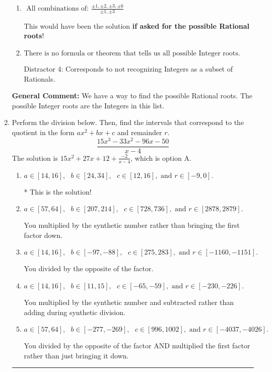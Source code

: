 \documentclass{extbook}[14pt]
\newcommand{\litem}[1]{\item #1

\rule{\textwidth}{0.4pt}}
\begin{document}
\begin{enumerate}
{\begin{enumerate}[label=\Alph*.]
 Distractor 3: Corresponds to the plus or minus of the inverse quotient (an/a0) of the factors. 
\item \( \text{ All combinations of: }\frac{\pm 1,\pm 2,\pm 3,\pm 6}{\pm 1,\pm 3} \)

This would have been the solution \textbf{if asked for the possible Rational roots}!
\item \( \text{There is no formula or theorem that tells us all possible Integer roots.} \)

 Distractor 4: Corresponds to not recognizing Integers as a subset of Rationals.
\end{enumerate}

\textbf{General Comment:} We have a way to find the possible Rational roots. The possible Integer roots are the Integers in this list.
}
\litem{
Perform the division below. Then, find the intervals that correspond to the quotient in the form $ax^2+bx+c$ and remainder $r$.
\[ \frac{15x^{3} -33 x^{2} -96 x -50}{x -4} \]The solution is \( 15x^{2} +27 x + 12 + \frac{-2}{x -4} \), which is option A.\begin{enumerate}[label=\Alph*.]
\item \( a \in [14, 16], \text{   } b \in [24, 34], \text{   } c \in [12, 16], \text{   and   } r \in [-9, 0]. \)

* This is the solution!
\item \( a \in [57, 64], \text{   } b \in [207, 214], \text{   } c \in [728, 736], \text{   and   } r \in [2878, 2879]. \)

 You multiplied by the synthetic number rather than bringing the first factor down.
\item \( a \in [14, 16], \text{   } b \in [-97, -88], \text{   } c \in [275, 283], \text{   and   } r \in [-1160, -1151]. \)

 You divided by the opposite of the factor.
\item \( a \in [14, 16], \text{   } b \in [11, 15], \text{   } c \in [-65, -59], \text{   and   } r \in [-230, -226]. \)

 You multiplied by the synthetic number and subtracted rather than adding during synthetic division.
\item \( a \in [57, 64], \text{   } b \in [-277, -269], \text{   } c \in [996, 1002], \text{   and   } r \in [-4037, -4026]. \)

 You divided by the opposite of the factor AND multiplied the first factor rather than just bringing it down.
\end{enumerate}

}
\end{enumerate}
\end{document}
